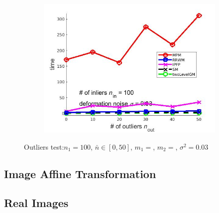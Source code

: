 \documentclass[
	fontsize=12pt,
	paper=a4,
	twoside=false,
	numbers=noenddot,
	plainheadsepline,
	toc=listof,
	toc=bibliography
]{scrartcl}
\begin{document}
\begin{figure}[ht]
\begin{subfigure}[b]{0.3\textwidth}
		\includegraphics[scale=0.25]{"fig_ver2108/syntheticPointSets/outliertest_n50/time_greedy"} 
	\end{subfigure} 	
	\caption{ Outliers test:$n_1=100$, $\bar{n}\in[0,50]$, $m_1=$, $m_2=$, $\sigma^2=0.03$}
\end{figure}


\subsection{Image Affine Transformation}


\subsection{Real Images}


	
\end{document}
